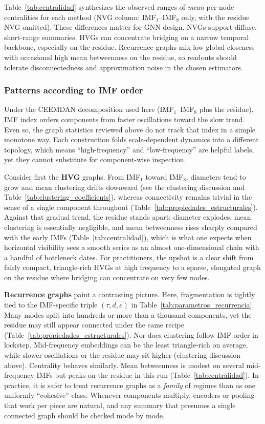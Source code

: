 \documentclass[11pt,a4paper]{article}
\begin{document}
Table~\ref{tab:centralidad} synthesizes the observed ranges of \emph{mean} per-node centralities for each method (NVG column: IMF$_1$--IMF$_8$ only, with the residue NVG omitted). These differences matter for GNN design. NVGs support diffuse, short-range summaries. HVGs can concentrate bridging on a narrow temporal backbone, especially on the residue. Recurrence graphs mix low global closeness with occasional high mean betweenness on the residue, so readouts should tolerate disconnectedness and approximation noise in the chosen estimators.

\subsubsection{Patterns according to IMF order}

Under the CEEMDAN decomposition used here (IMF$_1$--IMF$_8$ plus the residue), IMF index orders components from faster oscillations toward the slow trend. Even so, the graph statistics reviewed above do not track that index in a simple monotone way. Each construction folds scale-dependent dynamics into a different topology, which means ``high-frequency'' and ``low-frequency'' are helpful labels, yet they cannot substitute for component-wise inspection.

Consider first the \textbf{HVG} graphs. From IMF$_1$ toward IMF$_8$, diameters tend to grow and mean clustering drifts downward (see the clustering discussion and Table~\ref{tab:clustering_coefficients}), whereas connectivity remains trivial in the sense of a single component throughout (Table~\ref{tab:propiedades_estructurales}). Against that gradual trend, the residue stands apart: diameter explodes, mean clustering is essentially negligible, and mean betweenness rises sharply compared with the early IMFs (Table~\ref{tab:centralidad}), which is what one expects when horizontal visibility sees a smooth series as an almost one-dimensional chain with a handful of bottleneck dates. For practitioners, the upshot is a clear shift from fairly compact, triangle-rich HVGs at high frequency to a sparse, elongated graph on the residue where bridging can concentrate on very few nodes.

\textbf{Recurrence graphs} paint a contrasting picture. Here, fragmentation is tightly tied to the IMF-specific triple $(\tau,d,\varepsilon)$ in Table~\ref{tab:parametros_recurrencia}. Many modes split into hundreds or more than a thousand components, yet the residue may still appear connected under the same recipe (Table~\ref{tab:propiedades_estructurales}). Nor does clustering follow IMF order in lockstep. Mid-frequency embeddings can be the least triangle-rich on average, while slower oscillations or the residue may sit higher (clustering discussion above). Centrality behaves similarly. Mean betweenness is modest on several mid-frequency IMFs but peaks on the residue in this run (Table~\ref{tab:centralidad}). In practice, it is safer to treat recurrence graphs as a \emph{family} of regimes than as one uniformly ``cohesive'' class. Whenever components multiply, encoders or pooling that work per piece are natural, and any summary that presumes a single connected graph should be checked mode by mode.
\end{document}
